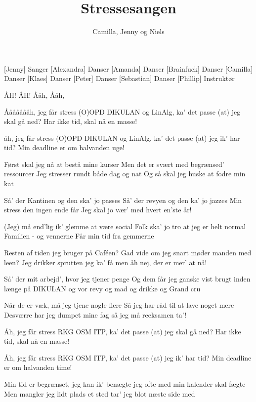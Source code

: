 \documentclass[a4paper,11pt]{article}
\title{Stressesangen}
\author{Camilla, Jenny og Niels}
\begin{document}
\maketitle

\begin{roles}
[Jenny] Sanger
[Alexandra] Danser
[Amanda] Danser
[Brainfuck] Danser
[Camilla] Danser
[Klaes] Danser
[Peter] Danser
[Sebastian] Danser
[Phillip] Instruktør
\end{roles}

\begin{song}
 ÅH! 
ÅH! 
Ååh, 
Ååh,

Åååååååh, jeg får stress
(O)OPD
DIKULAN
og LinAlg, ka' det passe
(at) jeg skal gå ned? Har ikke tid, skal nå en masse!

åh, jeg får stress
(O)OPD
DIKULAN
og LinAlg, ka' det passe
(at) jeg ik' har tid? Min deadline er om halvanden uge!

Først skal jeg nå at bestå mine kurser
Men det er svært med begrænsed' ressourcer
Jeg stresser rundt både dag og nat
Og så skal jeg huske at fodre min kat

Så' der Kantinen og den ska' jo passes
Så' der revyen og den ka' jo jazzes
Min stress den ingen ende får
Jeg skal jo vær' med hvert en'ste år!

(Jeg) må end'lig ik' glemme at være social
Folk ska' jo tro at jeg er helt normal
Familien - og vennerne
Får min tid fra gemmerne

Resten af tiden jeg bruger på Caféen?
Gad vide om jeg snart møder manden med leen?
Jeg drikker sprutten jeg ka' få
men åh nej, der er mer' at nå!

Så' der mit arbejd', hvor jeg tjener penge
Og dem får jeg ganske vist brugt inden længe
på DIKULAN og vor revy
og mad og drikke og Grand cru

Når de er væk, må jeg tjene nogle flere
Så jeg har råd til at lave noget mere
Desværre har jeg dumpet mine fag
så jeg må reeksamen ta'!

Åh, jeg får stress
RKG
OSM
ITP, ka' det passe
(at) jeg skal gå ned? Har ikke tid, skal nå en masse!

Åh, jeg får stress
RKG
OSM
ITP, ka' det passe
(at) jeg ik' har tid? Min deadline er om halvanden time!

Min tid er begrænset, jeg kan ik' benægte
jeg ofte med min kalender skal fægte
Men mangler jeg lidt plads et sted
tar' jeg blot næste side med


\end{song}
\end{document}
